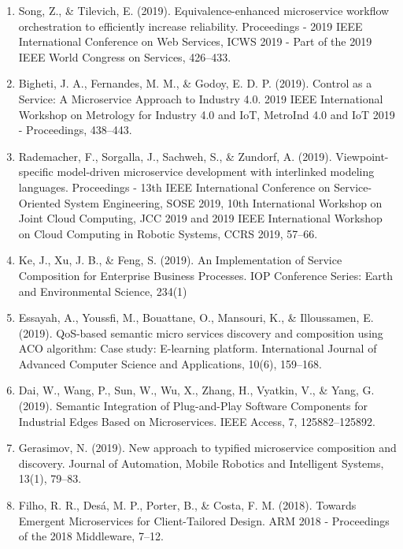 \documentclass{article}
\begin{document}
\begin{enumerate}
\item Song, Z., \& Tilevich, E. (2019). Equivalence-enhanced microservice workflow orchestration to efficiently increase reliability. Proceedings - 2019 IEEE International Conference on Web Services, ICWS 2019 - Part of the 2019 IEEE World Congress on Services, 426–433.

\item Bigheti, J. A., Fernandes, M. M., \& Godoy, E. D. P. (2019). Control as a Service: A Microservice Approach to Industry 4.0. 2019 IEEE International Workshop on Metrology for Industry 4.0 and IoT, MetroInd 4.0 and IoT 2019 - Proceedings, 438–443.

\item Rademacher, F., Sorgalla, J., Sachweh, S., \& Zundorf, A. (2019). Viewpoint-specific model-driven microservice development with interlinked modeling languages. Proceedings - 13th IEEE International Conference on Service-Oriented System Engineering, SOSE 2019, 10th International Workshop on Joint Cloud Computing, JCC 2019 and 2019 IEEE International Workshop on Cloud Computing in Robotic Systems, CCRS 2019, 57–66.

\item Ke, J., Xu, J. B., \& Feng, S. (2019). An Implementation of Service Composition for Enterprise Business Processes. IOP Conference Series: Earth and Environmental Science, 234(1)

\item Essayah, A., Youssfi, M., Bouattane, O., Mansouri, K., \& Illoussamen, E. (2019). QoS-based semantic micro services discovery and composition using ACO algorithm: Case study: E-learning platform. International Journal of Advanced Computer Science and Applications, 10(6), 159–168.

\item Dai, W., Wang, P., Sun, W., Wu, X., Zhang, H., Vyatkin, V., \& Yang, G. (2019). Semantic Integration of Plug-and-Play Software Components for Industrial Edges Based on Microservices. IEEE Access, 7, 125882–125892.

\item Gerasimov, N. (2019). New approach to typified microservice composition and discovery. Journal of Automation, Mobile Robotics and Intelligent Systems, 13(1), 79–83.

\item Filho, R. R., Desá, M. P., Porter, B., \& Costa, F. M. (2018). Towards Emergent Microservices for Client-Tailored Design. ARM 2018 - Proceedings of the 2018 Middleware, 7–12.


\end{enumerate}
\end{document}
